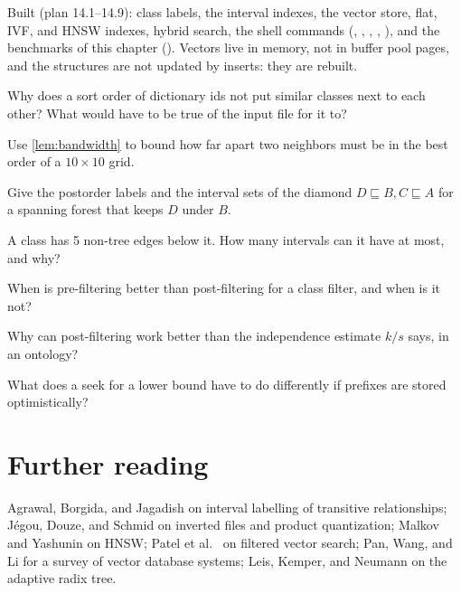 \begin{status}
Built (plan 14.1--14.9): class labels, the interval indexes, the vector store,
flat, IVF, and HNSW indexes, hybrid search, the shell commands
(, ,
, ,
), and the benchmarks of this chapter
(). Vectors live in memory, not in buffer pool pages,
and the structures are not updated by inserts: they are rebuilt.
\end{status}

\begin{checkyourself}
\item Why does a sort order of dictionary ids not put similar classes next to each other? What would have to be true of the input file for it to?
\item Use \cref{lem:bandwidth} to bound how far apart two neighbors must be in the best order of a $10 \times 10$ grid.
\item Give the postorder labels and the interval sets of the diamond $D \sqsubseteq B, C \sqsubseteq A$ for a spanning forest that keeps $D$ under $B$.
\item A class has 5 non-tree edges below it. How many intervals can it have at most, and why?
\item When is pre-filtering better than post-filtering for a class filter, and when is it not?
\item Why can post-filtering work better than the independence estimate $k/s$ says, in an ontology?
\item What does a seek for a lower bound have to do differently if prefixes are stored optimistically?
\end{checkyourself}

\section*{Further reading}
Agrawal, Borgida, and Jagadish \cite{agrawal1989} on interval labelling of
transitive relationships; Jégou, Douze, and Schmid \cite{jegou2011} on
inverted files and product quantization; Malkov and Yashunin \cite{malkov2020}
on HNSW; Patel et al.\ \cite{patel2024} on filtered vector search; Pan, Wang, and
Li \cite{pan2024} for a survey of vector database systems; Leis, Kemper, and
Neumann \cite{leis2013} on the adaptive radix tree.
